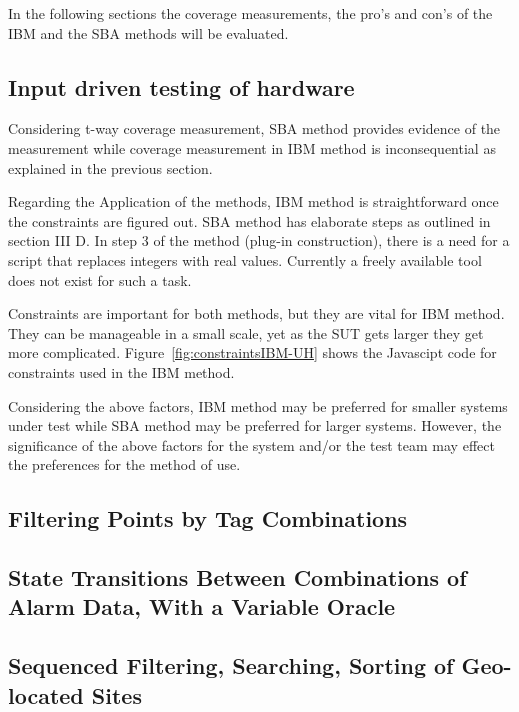 \documentclass[conference]{IEEEtran}
\begin{document}
	In the following sections the coverage measurements, the pro's and con's of the IBM and the SBA methods will be evaluated. 
		
	
	\subsection{Input driven testing of hardware}
	
	Considering t-way coverage measurement, SBA method provides evidence of the measurement while coverage measurement in IBM method is inconsequential as explained in the previous section. 
		
	Regarding the Application of the methods, IBM method is straightforward once the constraints are figured out. 
	SBA method has elaborate steps as outlined in section III D. 
	In step 3 of the method (plug-in construction), there is a need for a script that replaces integers with real values.
	Currently a freely available tool does not exist for such a task.
	
	Constraints are important for both methods, but they are vital for IBM method. 
	They can be manageable in a small scale, yet as the SUT gets larger they get more complicated. 
	Figure~\ref{fig:constraintsIBM-UH} shows the Javascipt code for constraints used in the IBM method.
	

	Considering the above factors, IBM method may be preferred for smaller systems under test while SBA method may be preferred for larger systems.
	However, the significance of the above factors for the system and/or the test team may effect the preferences for the method of use.

	\subsection{Filtering Points by Tag Combinations }

	\subsection{State Transitions Between Combinations of Alarm Data, With a Variable Oracle}

	\subsection{Sequenced Filtering, Searching, Sorting of Geo-located Sites}
	
\end{document}
